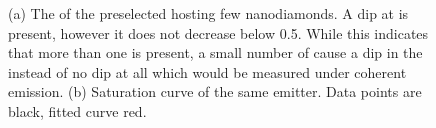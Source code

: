 					\begin{figure}[tp]
						\begin{subfigure}[t]{ 0.49\linewidth}
							\centering
							\caption{}
							\label{subfig::single_siv_g2_before_transfer_antenna}
						\end{subfigure}
						\hfill
						\begin{subfigure}[t]{ 0.49\linewidth}
							\centering
							\caption{}
							\label{subfig::single_siv_sat_before_transfer_antenna}
						\end{subfigure}
						\caption{(a) The \gtf of the preselected \nd hosting few nanodiamonds. A dip at \gtz is present, however it does not decrease below 0.5. While this indicates that more than one \siv is present, a small number of \sivs cause a dip in the \gtf instead of no dip at all which would be measured under coherent emission. (b) Saturation curve of the same emitter. Data points are black, fitted curve red.}
					\end{figure}


